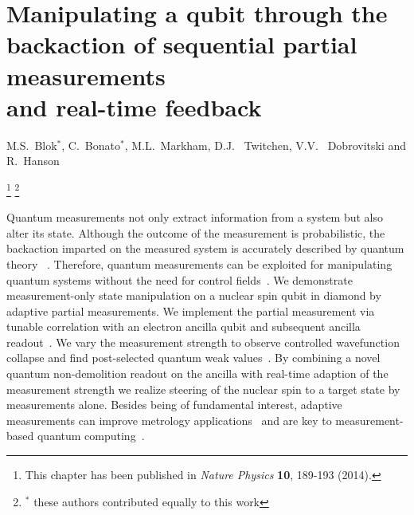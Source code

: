 \graphicspath{{./ch_adptv_msmnt_cntrl/figures/}}


\chapter[Manipulating a qubit through the backaction of adaptive measurements]{Manipulating a qubit through the backaction of sequential partial measurements \\ and real-time feedback }
\label{ch:AMC}

\begin{center} 
    \vspace{-1cm} {M.S.~Blok$^*$, C.~Bonato$^*$, M.L.~Markham, D.J. ~Twitchen, V.V. ~Dobrovitski and R.~Hanson} 
\end{center}


{\renewcommand{\thefootnote}{}\footnote{This chapter has been published in
    {\em Nature Physics} \textbf{10}, 189-193 (2014).}}
{\renewcommand{\thefootnote}{}\footnote{$^*$ these authors contributed equally to this work}}


\vspace{-0.5cm} 
Quantum measurements not only extract information from a system but also alter its state. Although the outcome of the measurement is probabilistic, the backaction imparted on the measured system is accurately described by quantum theory ~\cite{Guerlin_Nature_2007,Hatridge_Science_2013,Murch_Nature_2013}. Therefore, quantum measurements can be exploited for manipulating quantum systems without the need for control fields~\cite{Ashhab_PhysRevA_2010,Wiseman_NatureNV_2011}. We demonstrate measurement-only state manipulation on a nuclear spin qubit in diamond by adaptive partial measurements. We implement the partial measurement via tunable correlation with an electron ancilla qubit and subsequent ancilla readout~\cite{Brun_PhysRevA_2008,Groen_PRL_2013}. We vary the measurement strength to observe controlled wavefunction collapse and find post-selected quantum weak values~\cite{Brun_PhysRevA_2008,Groen_PRL_2013,Aharonov_PRL_1988,Pryde_PRL_2005,Dressel_Rev.Mod.Phys._2014}. By combining a novel quantum non-demolition readout on the ancilla with real-time adaption of the measurement strength we realize steering of the nuclear spin to a target state by measurements alone. Besides being of fundamental interest, adaptive measurements can improve metrology applications~\cite{Cappellaro_PhysRevA_2012,Higgins_Nature_2007} and are key to measurement-based quantum computing~\cite{Raussendorf_PRL_2001,Prevedel_Nature_2007}.


